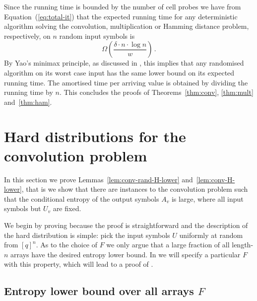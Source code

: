 \documentclass{toc}
\newcommand{\Xv}{\ensuremath{U_v}}
\newcommand{\Yv}{\ensuremath{A_v}}
\begin{document}
Since the running time is bounded by the number of cell probes we have from Equation~(\ref{eq:total-it}) that the expected running time for any deterministic algorithm solving the convolution, multiplication or Hamming distance problem, respectively, on $n$ random input symbols is
\[
\Omega\left(\frac{\delta\cdot n\cdot \log n}{w}\right)\,.
\]
By Yao's minimax principle, as discussed in , this implies that any randomised algorithm on its worst case input has the same lower bound on its expected running time.
The amortised time per arriving value is obtained by dividing the running time by $n$.
This concludes the proofs of Theorems~\ref{thm:conv}, \ref{thm:mult} and~\ref{thm:ham}.


\section{Hard distributions for the convolution problem} \label{sec:conv}

In this section we prove Lemmas~\ref{lem:conv-rand-H-lower} and~\ref{lem:conv-H-lower}, that is we show that there are instances to the convolution problem such that the conditional entropy of the output symbols $\Yv$ is large, where all input symbols but $\Xv$ are fixed.

We begin by proving  because the proof is straightforward and the description of the hard distribution is simple: pick the input symbols $U$ uniformly at random from $[q]^n$. As to the choice of $F$ we only argue that a large fraction of all
%
length-$n$
arrays have the desired entropy lower bound. In  we will specify a particular $F$ with this property, which will lead to a proof of .


\subsection{Entropy lower bound over all arrays \texorpdfstring{$F$}{F}} \label{sec:conv-random-F}
\end{document}
